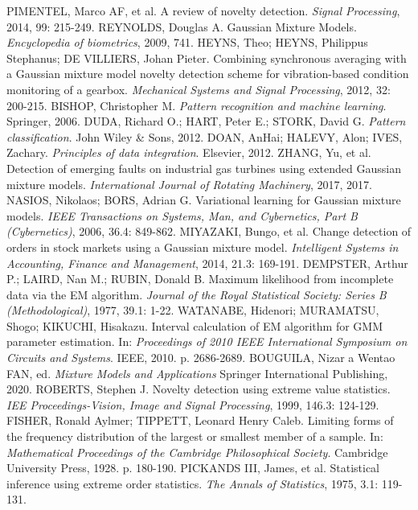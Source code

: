 \documentclass[11pt,twoside,openright]{report}
\begin{document}
\begin{thebibliography}{L}
PIMENTEL, Marco AF, et al. A review of novelty detection. \textit{Signal Processing}, 2014, 99: 215-249.
REYNOLDS, Douglas A. Gaussian Mixture Models. \textit{Encyclopedia of biometrics}, 2009, 741.
HEYNS, Theo; HEYNS, Philippus Stephanus; DE VILLIERS, Johan Pieter. Combining synchronous averaging with a Gaussian mixture model novelty detection scheme for vibration-based condition monitoring of a gearbox. \textit{Mechanical Systems and Signal Processing}, 2012, 32: 200-215.
BISHOP, Christopher M. \textit{Pattern recognition and machine learning}. Springer, 2006.
DUDA, Richard O.; HART, Peter E.; STORK, David G. \textit{Pattern classification}. John Wiley \& Sons, 2012.
DOAN, AnHai; HALEVY, Alon; IVES, Zachary. \textit{Principles of data integration}. Elsevier, 2012.
ZHANG, Yu, et al. Detection of emerging faults on industrial gas turbines using extended Gaussian mixture models. \textit{International Journal of Rotating Machinery}, 2017, 2017.
NASIOS, Nikolaos; BORS, Adrian G. Variational learning for Gaussian mixture models. \textit{IEEE Transactions on Systems, Man, and Cybernetics, Part B (Cybernetics)}, 2006, 36.4: 849-862.
MIYAZAKI, Bungo, et al. Change detection of orders in stock markets using a Gaussian mixture model. \textit{Intelligent Systems in Accounting, Finance and Management}, 2014, 21.3: 169-191.
DEMPSTER, Arthur P.; LAIRD, Nan M.; RUBIN, Donald B. Maximum likelihood from incomplete data via the EM algorithm. \textit{Journal of the Royal Statistical Society: Series B (Methodological)}, 1977, 39.1: 1-22.
WATANABE, Hidenori; MURAMATSU, Shogo; KIKUCHI, Hisakazu. Interval calculation of EM algorithm for GMM parameter estimation. In: \textit{Proceedings of 2010 IEEE International Symposium on Circuits and Systems}. IEEE, 2010. p. 2686-2689.
BOUGUILA, Nizar a Wentao FAN, ed. \textit{Mixture Models and Applications} Springer International Publishing, 2020.
ROBERTS, Stephen J. Novelty detection using extreme value statistics. \textit{IEE Proceedings-Vision, Image and Signal Processing}, 1999, 146.3: 124-129.
FISHER, Ronald Aylmer; TIPPETT, Leonard Henry Caleb. Limiting forms of the frequency distribution of the largest or smallest member of a sample. In: \textit{Mathematical Proceedings of the Cambridge Philosophical Society}. Cambridge University Press, 1928. p. 180-190.
PICKANDS III, James, et al. Statistical inference using extreme order statistics. \textit{The Annals of Statistics}, 1975, 3.1: 119-131.

\end{thebibliography}
\end{document}
